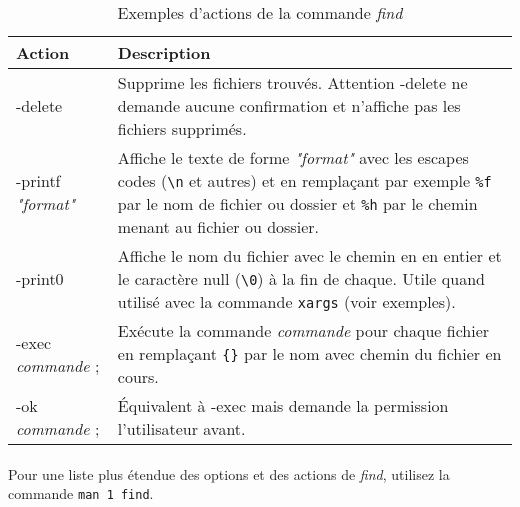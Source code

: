 \begin{table}[h]
    \centering
    \begin{tabular}{|l|p{10cm}|}
        \hline
        \textbf{Action} & \textbf{Description}\\
        \hline
        -delete                   & Supprime les fichiers trouvés. Attention
                                    -delete ne demande aucune confirmation et
                                    n'affiche pas les fichiers supprimés.\\
        \hline
        -printf \textit{"format"} & Affiche le texte de forme
                                    \textit{"format"} avec les escapes codes
                                    (\texttt{\textbackslash n} et autres) et en
                                    remplaçant par exemple \texttt{\%f} par le
                                    nom de fichier ou dossier et \texttt{\%h}
                                    par le chemin menant au fichier ou
                                    dossier.\\
        \hline
        -print0                   & Affiche le nom du fichier avec le chemin en
                                    en entier et le caractère null
                                    (\texttt{\textbackslash 0}) à la fin de
                                    chaque. Utile quand utilisé avec la
                                    commande \texttt{xargs} (voir exemples).\\
        \hline
        -exec \textit{commande} ; & Exécute la commande \textit{commande} pour
                                    chaque fichier en remplaçant \texttt{\{\}}
                                    par le nom avec chemin du fichier en
                                    cours.\\
        \hline
        -ok \textit{commande} ;   & Équivalent à -exec mais demande la
                                    permission l'utilisateur avant.\\
        \hline
    \end{tabular}
    \caption{Exemples d'actions de la commande \emph{find}}
    \label{tab:find-acts}
\end{table}

\pagebreak
\paragraph{}
Pour une liste plus étendue des options et des actions de \emph{find}, utilisez
la commande \lstinline|man 1 find|.

